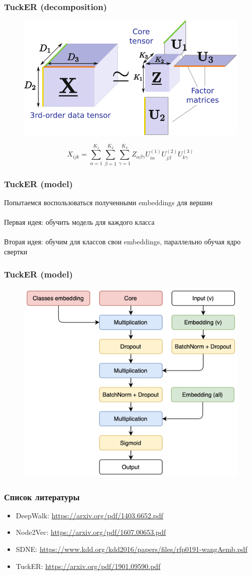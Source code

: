 \documentclass{beamer}
\newcommand{\skipline}[0]{$ $\\}
\begin{document}
\begin{frame}
    \frametitle{TuckER (decomposition)}
    \begin{figure}
        \includegraphics[width=0.6\columnwidth]{Tucker-decomposition.png}
    \end{figure}
    $$
    X_{ijk} = \sum_{\alpha=1}^{K_1} \sum_{\beta=1}^{K_2} \sum_{\gamma=1}^{K_3} 
    Z_{\alpha\beta\gamma} U^{(1)}_{i \alpha} U^{(2)}_{j \beta} U^{(3)}_{k \gamma} 
    $$
\end{frame}

\begin{frame}
    \frametitle{TuckER (model)}
    Попытаемся воспользоваться полученными embeddings для вершин
    \skipline
    \skipline
    Первая идея: обучить модель для каждого класса
    \skipline
    \skipline
    Вторая идея: обучим для классов свои embeddings, параллельно обучая ядро свертки
\end{frame}

\begin{frame}
    \frametitle{TuckER (model)}
    \begin{figure}
        \includegraphics[width=0.7\columnwidth]{Diagram.png}
    \end{figure}
\end{frame}

\begin{frame}
\frametitle{Список литературы}
\begin{itemize}
    \item DeepWalk: \url{https://arxiv.org/pdf/1403.6652.pdf}
    \item Node2Vec: \url{https://arxiv.org/pdf/1607.00653.pdf}
    \item SDNE: \url{https://www.kdd.org/kdd2016/papers/files/rfp0191-wangAemb.pdf}
    \item TuckER: \url{https://arxiv.org/pdf/1901.09590.pdf}
\end{itemize}
\end{frame}
\end{document}
